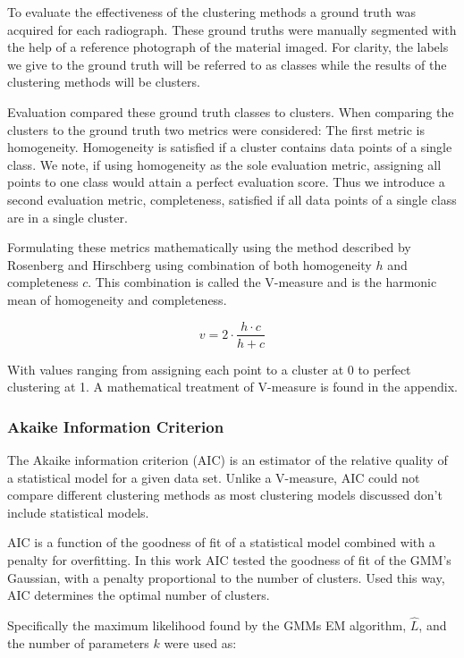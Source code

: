 \documentclass[a4paper,11pt]{article}
\begin{document}
To evaluate the effectiveness of the clustering methods a ground truth was acquired for each radiograph. These ground truths were manually segmented with the help of a reference photograph of the material imaged. For clarity, the labels we give to the ground truth will be referred to as classes while the results of the clustering methods will be clusters.

Evaluation compared these ground truth classes to clusters. When comparing the clusters to the ground truth two metrics were considered: The first metric is homogeneity. Homogeneity is satisfied if a cluster contains data points of a single class. We note, if using homogeneity as the sole evaluation metric, assigning all points to one class would attain a perfect evaluation score. Thus we introduce a second evaluation metric, completeness, satisfied if all data points of a single class are in a single cluster. 

Formulating these metrics mathematically using the method described by Rosenberg and Hirschberg \cite{Rosenberg} using combination of both homogeneity $h$ and completeness $c$. This combination is called the V-measure and is the harmonic mean of homogeneity and completeness.

\begin{equation}
v = 2 \cdot \frac{h \cdot c}{h + c}
\end{equation}

With values ranging from assigning each point to a cluster at 0 to perfect clustering at 1. A mathematical treatment of V-measure is found in the appendix.

\subsubsection{Akaike Information Criterion}

The Akaike information criterion (AIC) \cite{Akaike} is an estimator of the relative quality of a statistical model for a given data set. Unlike a V-measure, AIC could not compare different clustering methods as most clustering models discussed don't include statistical models.

AIC is a function of the goodness of fit of a statistical model combined with a penalty for overfitting. In this work AIC tested the goodness of fit of the GMM's Gaussian, with a penalty proportional to the number of clusters. Used this way, AIC determines the optimal number of clusters.

Specifically the maximum likelihood found by the GMMs EM algorithm, $\hat L$, and the number of parameters $k$ were used as:
\end{document}
